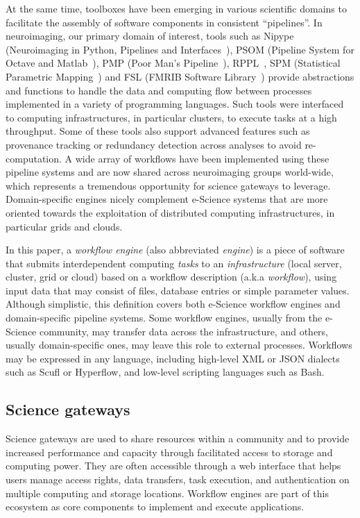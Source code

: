 \documentclass[preprint,3p,twocolumn]{elsarticle}
\begin{document}
At the same time, toolboxes have been emerging in various scientific
domains to facilitate the assembly of software components in
consistent ``pipelines''. In neuroimaging, our primary domain of
interest, tools such as Nipype (Neuroimaging in Python, Pipelines and
Interfaces~\cite{gorgolewski2011nipype}), PSOM (Pipeline System for
Octave and Matlab~\cite{bellec2012pipeline}), 
PMP (Poor Man's Pipeline~\cite{Ad-DabbaghY2006}), RPPL~\cite{1174106}, SPM (Statistical
Parametric Mapping~\cite{ashburner2011spm}) and FSL (FMRIB Software
Library~\cite{Jenkinson2012782}) provide abstractions and functions to
handle the data and computing flow between processes implemented in a
variety of programming languages. Such tools were interfaced to
computing infrastructures, in particular
clusters, to execute tasks at a high throughput. Some of
these tools also support advanced features such as provenance
tracking or  redundancy detection across
analyses to avoid re-computation. A wide array of workflows
have been implemented using these pipeline systems and are now shared across
neuroimaging groups world-wide, which represents a tremendous
opportunity for science gateways to leverage. Domain-specific engines
nicely complement e-Science systems that are more oriented towards the
exploitation of distributed computing infrastructures, in particular
grids and clouds.

In this paper, a
\emph{workflow engine} (also abbreviated \emph{engine}) is a piece of
software that submits interdependent computing \emph{tasks} to an
\emph{infrastructure} (local server, cluster, grid or cloud) based on
a workflow description (a.k.a \emph{workflow}), using input data
that may consist of files, database entries or simple parameter
values. Although simplistic, this definition covers both e-Science workflow engines and
domain-specific pipeline systems.
Some workflow engines, 
usually from the e-Science community, 
may transfer data across the infrastructure, and others, usually
domain-specific ones, may leave this role to external processes. Workflows
may be expressed in any language, including high-level XML or JSON
dialects such as Scufl or Hyperflow, and low-level scripting languages
such as Bash.

\subsection{Science gateways}

\label{sec:intro_sg}

Science gateways are used to share resources within a community and to
provide increased performance and capacity through facilitated access
to storage and computing power. They are often accessible through a
web interface that helps users manage access rights, data transfers,
task execution, and authentication on multiple computing and storage
locations. Workflow engines are part of this ecosystem as core
components to implement and execute
applications. 
\end{document}
